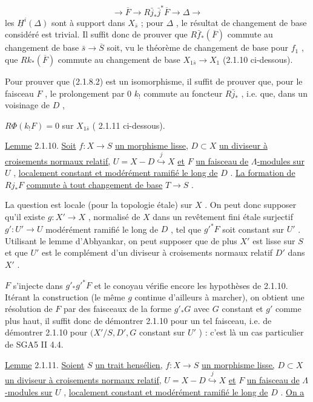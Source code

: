\begin{equation*}
\longrightarrow \overline{F} \longrightarrow R\bar j_* \bar j^* \overline{F} \longrightarrow \Delta \longrightarrow
\end{equation*}
les $\underline{H}^i(\Delta)$ sont à support dans $X_{\bar s}$ ; pour $\Delta$ , le résultat de changement de base considéré est trivial. Il suffit donc de prouver que $R\bar f_*(\overline{F})$ commute au changement de base $\bar s \to \overline{S}$ soit, vu le théorème de changement de base pour $f_1$ , que
$Rk_*(\overline{F})$ commute au changement de base $X_{1\bar s} \to X_1$ (2.1.10 ci-dessous).

Pour prouver que (2.1.8.2) est un isomorphisme, il suffit de prouver que, pour le faisceau $F$ , le prolongement par $0$ $k_!$ commute au foncteur $R\bar j_*$ , i.e. que, dans un voisinage de $D$ ,

$R\Phi(k_! F) = 0$ sur $X_{1\bar s}$ ( 2.1.11 ci-dessous).

\underline{Lemme} 2.1.10. \underline{Soit} $f : X \to S$ \underline{un morphisme lisse,} $D \subset X$ \underline{un diviseur à croisements normaux relatif,} $U = X - D \stackrel{j}{\hookrightarrow} X$ \underline{et} $F$ \underline{un faisceau de} $\Lambda$\underline{-modules sur} $U$ , \underline{localement constant et modérément ramifié le long de} $D$ . \underline{La formation de} $Rj_* F$ \underline{commute à tout changement de base} $T \to S$ .

La question est locale (pour la topologie étale) sur $X$ . On peut donc supposer qu'il existe $g : X' \to X$ , normalisé de $X$ dans un revêtement fini étale surjectif $g' : U' \to U$ modérément ramifié le long de $D$ , tel que $g'^* F$ soit constant sur $U'$ . Utilisant le lemme d'Abhyankar, on peut supposer que de plus $X'$ est lisse sur $S$ et que $U'$ est le complément d'un diviseur à croisements normaux relatif $D'$ dans $X'$ .

$F$ s'injecte dans $g'_* g'^* F$ et le conoyau vérifie encore les hypothèses de 2.1.10. Itérant la construction (le même $g$ continue d'ailleurs à marcher), on obtient une résolution de $F$ par des faisceaux de la forme $g'_* G$ avec $G$ constant et $g'$ comme plus haut, il suffit donc de démontrer 2.1.10 pour un tel faisceau, i.e. de démontrer 2.1.10 pour $(X'/S, D', G$ constant sur $U'$ ) : c'est là un cas particulier de SGA5 II 4.4.

\underline{Lemme} 2.1.11. \underline{Soient} $S$ \underline{un trait hensélien,} $f : X \to S$ \underline{un morphisme lisse,} $D \subset X$ \underline{un diviseur à croisements normaux relatif,} $U = X - D \stackrel{j}{\hookrightarrow} X$ \underline{et} $F$ \underline{un faisceau de} $\Lambda$\underline{-modules sur} $U$ , \underline{localement constant et modérément ramifié le long de} $D$ . \underline{On a}

